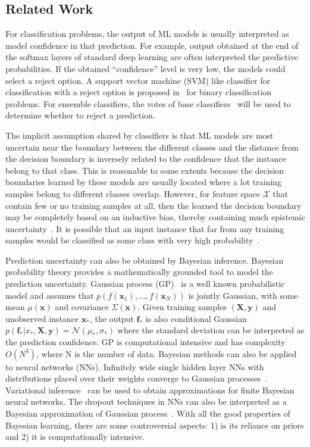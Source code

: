 
\subsection{Related Work}
For classification problems,  the output of ML models is usually interpreted as model confidence in that prediction. For example,  output obtained at the end of the softmax layers of standard deep learning are often interpreted the predictive probabilities. If the obtained ``confidence'' level is very low, the models could select a reject option. A support vector machine (SVM) like classifier for classification with a reject option is proposed in~\cite{bartlett2008} for binary classification problems. For ensemble classifiers, the votes of base classifiers~\cite{varshney2013practical} will be used to determine whether to reject a prediction.  

The implicit assumption shared by classifiers is that ML models are most uncertain near the boundary between the different classes  and the distance from the decision boundary is inversely related to the confidence that the instance belong to that class. This is reasonable  to some extents because the decision boundaries learned by these models are usually located where a lot training samples belong to different classes overlap.   However, for feature space $\mathcal X$ that  contain few or no training samples at all,  then the learned the decision boundary may be completely based on an inductive bias, thereby containing much epistemic uncertainty~\cite{Attenberg:2015}. It is possible that an input instance that far from any training samples would be classified as some class  with very high probability~\cite{gal2016dropout}. 

Prediction uncertainty can also be obtained by Bayesian inference.  Bayesian probability theory provides a mathematically grounded tool to model the prediction uncertainty.   Gaussian process (GP)~\cite{seeger2004gaussian} is a  well known   probabilistic model and assumes that $p(f(\mathbf x_1), \ldots, f(\mathbf x_N ))$ is jointly Gaussian, with some mean $\mu(\mathbf x)$ and covariance $\Sigma(\mathbf x)$.  Given training samples $(\mathbf X,\mathbf y)$ and unobserved instance $\mathbf x_*$, the output $\mathbf f_*$ is also conditional Gaussian $p(\mathbf f_*|x_*,\mathbf X,\mathbf y)=\mathcal N(\mu_*,\sigma_*)$ where the standard deviation can be interpreted as the prediction confidence. GP is  computational intensive and has complexity $O(N^3)$, where N is the number of data.  Bayesian methods can also be applied to neural networks (NNs). Infinitely wide single hidden layer NNs with distributions placed over their weights converge to Gaussian processes~\cite{neal2012bayesian}. Variational inference~\cite{paisley2012variational,kingma2013auto} can be used to obtain  approximations for finite Bayesian neural networks. The  dropout  techniques in NNs can also be interpreted as a Bayesian approximation of  Gaussian process~\cite{gal2016dropout}. With all the good properties of Bayesian learning,  there are some  controversial aspects: 1) is its reliance on priors and  2) it is  computationally intensive.

